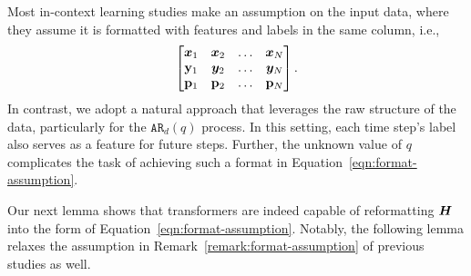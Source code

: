 \begin{remark}\label{remark:format-assumption}
    Most in-context learning studies \cite{akyrek2023what, bai2024transformers, li2023transformers} make an assumption on the input data, where they assume it is formatted with features and labels in the same column, i.e.,
\begin{equation}\label{eqn:format-assumption}
\begin{bmatrix}
    \bm{x}_1 &  \bm{x}_2 & \dots & \bm{x}_{N} 
    \\ 
    \mathbf{y}_1 & \bm{y}_2 & \dots & \bm{y}_{N}
    \\
    \mathbf{p}_1 & \mathbf{p}_2 & \dots & \mathbf{p}_{N}
\end{bmatrix}.
\end{equation}
In contrast, we adopt a natural approach that leverages the raw structure of the data, particularly for the $\mathtt{AR}_d(q)$ process. 
In this setting, each time step’s label also serves as a feature for future steps. 
Further, the unknown value of $q$ complicates the task of achieving such a format in Equation~\eqref{eqn:format-assumption}.
\end{remark}

Our next lemma shows that transformers are indeed capable of reformatting $\boldsymbol{H}$ into the form of Equation~\ref{eqn:format-assumption}.
Notably, the following lemma relaxes the assumption in Remark~\ref{remark:format-assumption} of previous studies as well.

